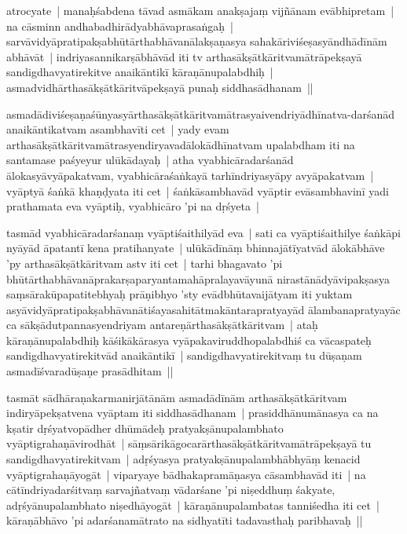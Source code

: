 \documentclass[article,12pt,a4paper]{memoir}%
\newcounter{parCount}
\begin{document}
	  \pstart \leavevmode%
	\label{thakur75-17.23}atrocyate | manaḥśabdena tāvad asmākam anakṣajaṃ vijñānam evābhipretam | na cāsminn andhabadhirādyabhāvaprasaṅgaḥ | sarvāvidyāpratipakṣabhūtārthabhāvanālakṣaṇasya sahakāriviśeṣasyāndhādīnām abhāvāt | indriyasannikarṣābhāvād iti tv arthasākṣātkāritvamātrāpekṣayā sandigdhavyatirekitve anaikāntikī kāraṇānupalabdhiḥ | asmadvidhārthasākṣātkāritvāpekṣayā punaḥ siddhasādhanam || 
	{}
	\pend%
      

	  \pstart \leavevmode%
	\label{thakur75-17.28}asmadādiviśeṣaṇaśūnyasyārthasākṣātkāritvamātrasyaivendriyādhīnatva-darśanād anaikāntikatvam asambhavīti cet | yady evam arthasākṣātkāritvamātrasyendiryavadālokādhīnatvam upalabdham iti na santamase paśyeyur ulūkādayaḥ | atha vyabhicāradarśanād ālokasyāvyāpakatvam, vyabhicāraśaṅkayā tarhīndriyasyāpy avyāpakatvam | vyāptyā śaṅkā khaṇḍyata iti cet | śaṅkāsambhavād vyāptir evāsambhavinī yadi prathamata eva vyāptiḥ, vyabhicāro 'pi na dṛśyeta | 
	{}
	\pend%
      

	  \pstart \leavevmode%
	\label{thakur75-18.1}tasmād vyabhicāradarśanaṃ vyāptiśaithilyād eva | sati ca vyāptiśaithilye śaṅkāpi nyāyād āpatantī kena pratihanyate | ulūkādīnāṃ bhinnajātīyatvād ālokābhāve 'py arthasākṣātkāritvam astv iti cet | tarhi bhagavato 'pi bhūtārthabhāvanāprakarṣaparyantamahāpralayavāyunā nirastānādyāvipakṣasya saṃsārakūpapatitebhyaḥ prāṇibhyo 'sty evādbhūtavaijātyam iti yuktam asyāvidyāpratipakṣabhāvanātiśayasahitātmakāntarapratyayād ālambanapratyayāc ca sākṣādutpannasyendriyam antareṇārthasākṣātkāritvam | ataḥ kāraṇānupalabdhiḥ kāśikākārasya vyāpakaviruddhopalabdhiś ca vācaspateḥ sandigdhavyatirekitvād anaikāntikī | sandigdhavyatirekitvaṃ tu dūṣaṇam asmadīśvaradūṣaṇe prasādhitam || 
	{}
	\pend%
      

	  \pstart \leavevmode%
	\label{thakur75-18.10}tasmāt sādhāraṇakarmanirjātānām asmadādīnām arthasākṣātkāritvam indiryāpekṣatvena vyāptam iti siddhasādhanam | prasiddhānumānasya ca na kṣatir dṛśyatvopādher dhūmādeḥ pratyakṣānupalambhato vyāptigrahaṇāvirodhāt | sāṃsārikāgocarārthasākṣātkāritvamātrāpekṣayā tu sandigdhavyatirekitvam | adṛśyasya pratyakṣānupalambhābhyāṃ kenacid vyāptigrahaṇāyogāt | viparyaye bādhakapramāṇasya cāsambhavād iti | na cātīndriyadarśitvaṃ sarvajñatvaṃ vādarśane 'pi niṣeddhuṃ śakyate, adṛśyānupalambhato niṣedhāyogāt | kāraṇānupalambatas tanniśedha iti cet | kāraṇābhāvo 'pi adarśanamātrato na sidhyatīti tadavasthaḥ paribhavaḥ || 
	{}
	\pend%
      
\end{document}
